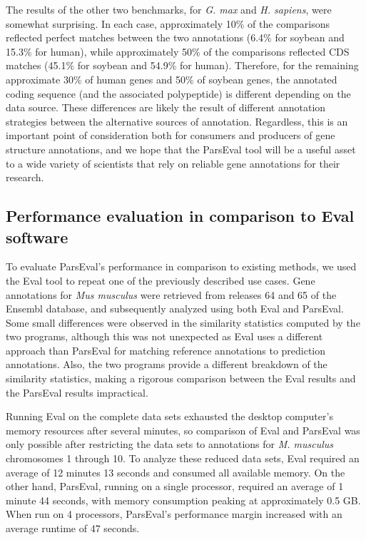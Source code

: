 The results of the other two benchmarks, for \textit{G. max} and \textit{H. sapiens}, were somewhat surprising.
In each case, approximately 10\% of the comparisons reflected perfect matches between the two annotations (6.4\% for soybean and 15.3\% for human), while approximately 50\% of the comparisons reflected CDS matches (45.1\% for soybean and 54.9\% for human).
Therefore, for the remaining approximate 30\% of human genes and 50\% of soybean genes, the annotated coding sequence (and the associated polypeptide) is different depending on the data source.
These differences are likely the result of different annotation strategies between the alternative sources of annotation.
Regardless, this is an important point of consideration both for consumers and producers of gene structure annotations, and we hope that the ParsEval tool will be a useful asset to a wide variety of scientists that rely on reliable gene annotations for their research.


\subsection{Performance evaluation in comparison to Eval software}
To evaluate ParsEval's performance in comparison to existing methods, we used the Eval tool \citep{Keibler} to repeat one of the previously described use cases.
Gene annotations for \textit{Mus musculus} were retrieved from releases 64 and 65 of the Ensembl database, and subsequently analyzed using both Eval and ParsEval.
Some small differences were observed in the similarity statistics computed by the two programs, although this was not unexpected as Eval uses a different approach than ParsEval for matching reference annotations to prediction annotations.
Also, the two programs provide a different breakdown of the similarity statistics, making a rigorous comparison between the Eval results and the ParsEval results impractical.

Running Eval on the complete data sets exhausted the desktop computer's memory resources after several minutes, so comparison of Eval and ParsEval was only possible after restricting the data sets to annotations for \textit{M. musculus} chromosomes 1 through 10.
To analyze these reduced data sets, Eval required an average of 12 minutes 13 seconds and consumed all available memory.
On the other hand, ParsEval, running on a single processor, required an average of 1 minute 44 seconds, with memory consumption peaking at approximately 0.5 GB.
When run on 4 processors, ParsEval's performance margin increased with an average runtime of 47 seconds.

